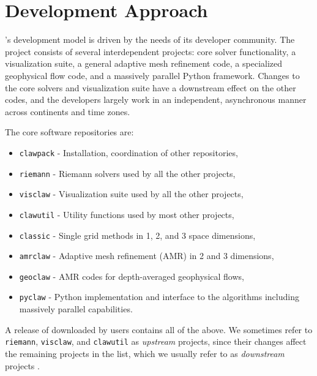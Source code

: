 %
%
%

\section{Development Approach} \label{sec:development}

\clawpack's development model is driven by the needs of its
developer community.  The \clawpack project consists of several
interdependent projects: core solver functionality, a
visualization suite, a general adaptive mesh refinement code, a
specialized geophysical flow code, and a massively parallel Python
framework.  Changes to the core solvers and visualization suite have a
downstream effect on the other codes, and the developers largely work
in an independent, asynchronous manner across continents and time
zones.

\vskip 5pt
The core \clawpack software repositories are:
\begin{itemize}
    \item \texttt{clawpack} - Installation, coordination of other repositories,
    \item \texttt{riemann} - Riemann solvers used by all the other projects,
    \item \texttt{visclaw} - Visualization suite used by all the other projects,
    \item \texttt{clawutil} - Utility functions used by most other projects,
    \item \texttt{classic} - Single grid methods in 1, 2, and 3 space
    dimensions,
    \item \texttt{amrclaw} - Adaptive mesh refinement (AMR) in 2 and 3 dimensions,
    \item \texttt{geoclaw} - AMR codes for depth-averaged geophysical flows,
    \item \texttt{pyclaw} - Python implementation and interface to the \clawpack algorithms including massively parallel capabilities.
\end{itemize}

\noindent
A release of \clawpack downloaded by users contains all of the above.
We sometimes refer to \texttt{riemann}, \texttt{visclaw}, and
\texttt{clawutil} as \textit{upstream} projects, since their changes
affect the remaining projects  in the list, which
we usually refer to as \textit{downstream} projects
.  

